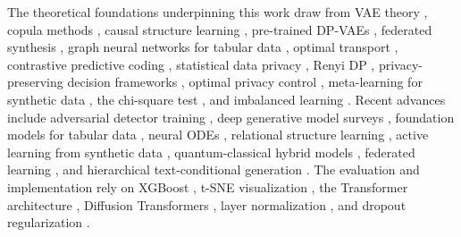 The theoretical foundations underpinning this work draw from VAE theory \cite{kingma2014vae}, copula methods \cite{nelsen2006copulas}, causal structure learning \cite{zheng2024causal}, pre-trained DP-VAEs \cite{jiang2023dp2vae}, federated synthesis \cite{rajotte2022fedsyn}, graph neural networks for tabular data \cite{zhu2023gnn}, optimal transport \cite{villani2009optimal, hallin2021ksample}, contrastive predictive coding \cite{oord2018representation}, statistical data privacy \cite{slavkovic2023statistical}, Renyi DP \cite{balle2020renyi}, privacy-preserving decision frameworks \cite{haney2024decision}, optimal privacy control \cite{xu2024optimal}, meta-learning for synthetic data \cite{triantafillou2022metalearning}, the chi-square test \cite{pearson1900criterion}, and imbalanced learning \cite{he2009imbalanced, chawla2002smote}. Recent advances include adversarial detector training \cite{liu2023adversarial}, deep generative model surveys \cite{jordon2022deepgen}, foundation models for tabular data \cite{van2024foundation, bommasani2022opportunities}, neural ODEs \cite{garcia2024neural}, relational structure learning \cite{liu2023goggle}, active learning from synthetic data \cite{haussmann2020imital}, quantum-classical hybrid models \cite{coyle2024quantum}, federated learning \cite{mcmahan2017fedavg}, and hierarchical text-conditional generation \cite{ramesh2022clip}. The evaluation and implementation rely on XGBoost \cite{chen2016xgboost}, t-SNE visualization \cite{maaten2008tsne}, the Transformer architecture \cite{vaswani2017attention}, Diffusion Transformers \cite{peebles2023dit}, layer normalization \cite{ba2016layernorm}, and dropout regularization \cite{srivastava2014dropout}.
